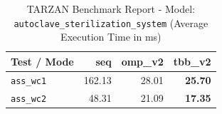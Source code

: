 \begin{table}[htbp]
\centering
\caption{TARZAN Benchmark Report - Model: \texttt{autoclave\_sterilization\_system} (Average Execution Time in ms)}
\label{tab:autoclave_sterilization_system_benchmark}
\begin{tabular}{lrrr}
\toprule
\textbf{Test / Mode} & \textbf{seq} & \textbf{omp\_v2} & \textbf{tbb\_v2} \\
\midrule
\texttt{ass\_wc1} & 162.13 & 28.01 & \textbf{25.70} \\
\texttt{ass\_wc2} & 48.31 & 21.09 & \textbf{17.35} \\
\bottomrule
\end{tabular}
\end{table}